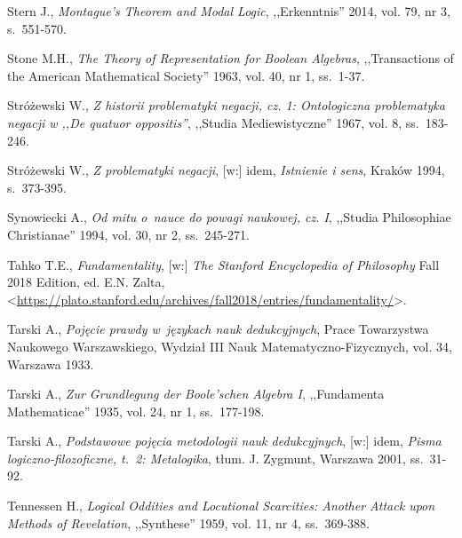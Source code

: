 \begin{thebibliography}{100}
Stern J., \textit{Montague's Theorem and Modal Logic}, ,,Erkenntnis'' 2014, vol. 79, nr 3, s.~551-570.

Stone M.H., \textit{The Theory of Representation for Boolean Algebras}, ,,Transactions of the American Mathematical Society'' 1963, vol. 40, nr 1, ss.~1-37.

Stróżewski W., \textit{Z historii problematyki negacji, cz. 1: Ontologiczna problematyka negacji w ,,De quatuor oppositis''}, ,,Studia Mediewistyczne'' 1967, vol. 8, ss.~183-246.

Stróżewski W., \textit{Z problematyki negacji}, [w:] idem, \textit{Istnienie i sens}, Kraków 1994, s.~373-395.


Synowiecki A., \textit{Od mitu o~nauce do powagi naukowej, cz. I}, ,,Studia Philosophiae Christianae'' 1994, vol. 30, nr 2, ss.~245-271.

Tahko T.E., \textit{Fundamentality}, [w:] \textit{The Stanford Encyclopedia of Philosophy}
Fall 2018 Edition, ed. E.N. Zalta, {\textless}\url{https://plato.stanford.edu/archives/fall2018/entries/fundamentality/}{\textgreater}.

Tarski A., \textit{Pojęcie prawdy w~językach nauk dedukcyjnych}, Prace Towarzystwa Naukowego Warszawskiego, Wydział III Nauk Matematyczno-Fizycznych, vol. 34, Warszawa 1933.

Tarski A., \textit{Zur Grundlegung der Boole'schen Algebra I}, ,,Fundamenta Mathematicae'' 1935, vol. 24, nr 1, ss.~177-198.

Tarski A., \textit{Podstawowe pojęcia metodologii nauk dedukcyjnych}, [w:] idem, \textit{Pisma logiczno-filozoficzne, t.~2: Metalogika},
tłum. J. Zygmunt, Warszawa 2001, ss.~31-92.



Tennessen H., \textit{Logical Oddities and Locutional Scarcities: Another Attack upon Methods of Revelation}, ,,Synthese'' 1959, vol. 11, nr 4, ss.~369-388.


\end{thebibliography}

